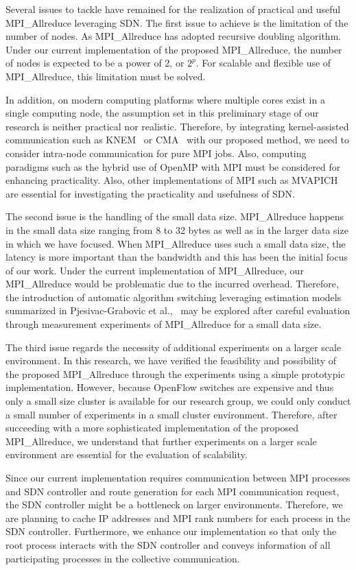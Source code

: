 Several issues to tackle have remained for the realization of practical
and useful MPI\_Allreduce leveraging SDN\@. The first issue to
achieve is the limitation of the number of nodes. As
MPI\_Allreduce has adopted recursive doubling algorithm. Under
our current implementation of the proposed MPI\_Allreduce, the
number of nodes is expected to be a power of 2, or \(2^p\). For scalable
and flexible use of MPI\_Allreduce, this limitation must be
solved.

In addition, on modern computing platforms where multiple cores exist in
a single computing node, the assumption set in this preliminary stage of
our research is neither practical nor realistic. Therefore, by
integrating kernel-assisted communication such as KNEM~\autocite{Goglin2013}
or CMA~\autocite{cma} with our proposed method, we need to consider
intra-node communication for pure MPI jobs. Also, computing paradigms
such as the hybrid use of OpenMP with MPI must be considered for
enhancing practicality. Also, other implementations of MPI such as
MVAPICH~\autocite{mvapich} are essential for investigating the practicality
and usefulness of SDN\@.

The second issue is the handling of the small data size.
MPI\_Allreduce happens in the small data size ranging from 8 to
32 bytes as well as in the larger data size in which we have focused.
When MPI\_Allreduce uses such a small data size, the latency is
more important than the bandwidth and this has been the initial focus of
our work. Under the current implementation of MPI\_Allreduce,
our MPI\_Allreduce would be problematic due to the incurred
overhead. Therefore, the introduction of automatic algorithm switching
leveraging estimation models summarized in Pjesivac-Grabovic et
al.,~\autocite{PjesivacGrbovic} may be explored after careful evaluation through
measurement experiments of MPI\_Allreduce for a small data size.

The third issue regards the necessity of additional experiments on a
larger scale environment. In this research, we have verified the
feasibility and possibility of the proposed MPI\_Allreduce
through the experiments using a simple prototypic implementation.
However, because OpenFlow switches are expensive and thus only a small
size cluster is available for our research group, we could only conduct
a small number of experiments in a small cluster environment. Therefore,
after succeeding with a more sophisticated implementation of the
proposed MPI\_Allreduce, we understand that further experiments
on a larger scale environment are essential for the evaluation of
scalability.

Since our current implementation requires communication between MPI
processes and SDN controller and route generation for each MPI
communication request, the SDN controller might be a bottleneck on
larger environments. Therefore, we are planning to cache IP addresses
and MPI rank numbers for each process in the SDN controller.
Furthermore, we enhance our implementation so that only the root process
interacts with the SDN controller and conveys information of all
participating processes in the collective communication.
